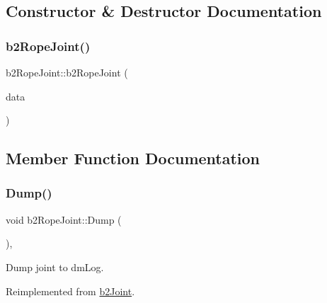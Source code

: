 \subsection{Constructor \& Destructor Documentation}
\mbox{\label{classb2_rope_joint_a3f69f238616d8dc622d9448f81e14e53}} 
\subsubsection{\texorpdfstring{b2RopeJoint()}{b2RopeJoint()}}
{\footnotesize\ttfamily b2\+Rope\+Joint\+::b2\+Rope\+Joint (\begin{DoxyParamCaption}\item[{const \mbox{\hyperlink{structb2_rope_joint_def}{b2\+Rope\+Joint\+Def}} $\ast$}]{data }\end{DoxyParamCaption})\hspace{0.3cm}{\ttfamily [protected]}}



\subsection{Member Function Documentation}
\mbox{\label{classb2_rope_joint_a0028d3d3710bf1a9a905e9b55a4f37c5}} 
\subsubsection{\texorpdfstring{Dump()}{Dump()}}
{\footnotesize\ttfamily void b2\+Rope\+Joint\+::\+Dump (\begin{DoxyParamCaption}{ }\end{DoxyParamCaption})\hspace{0.3cm}{\ttfamily [override]}, {\ttfamily [virtual]}}



Dump joint to dm\+Log. 



Reimplemented from \mbox{\hyperlink{classb2_joint_abd35e7316017ad9a40d5dbf9b5ba3f36}{b2\+Joint}}.

\mbox{\label{classb2_rope_joint_a5757fdeb008bf1bbe15348e80aab9402}} 
